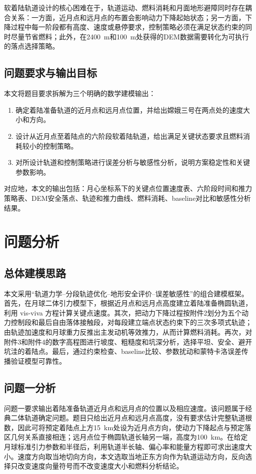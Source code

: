 \documentclass[UTF8,a4paper,12pt]{ctexart}
\begin{document}
软着陆轨道设计的核心困难在于，轨道运动、燃料消耗和月面地形避障同时存在耦合关系：一方面，近月点和远月点的布置会影响动力下降起始状态；另一方面，下降过程中每一阶段都有高度、速度或悬停要求，控制策略必须在满足状态约束的同时尽量节省燃料；此外，在\SI{2400}{m}和\SI{100}{m}处获得的DEM数据需要转化为可执行的落点选择策略。

\subsection{问题要求与输出目标}
本文将题目要求拆解为三个明确的数学建模输出：
\begin{enumerate}[label=（\arabic*）]
  \item 确定着陆准备轨道的近月点和远月点位置，并给出嫦娥三号在两点处的速度大小和方向。
  \item 设计从近月点至着陆点的六阶段软着陆轨道，给出满足关键状态要求且燃料消耗较小的控制策略。
  \item 对所设计轨道和控制策略进行误差分析与敏感性分析，说明方案稳定性和关键参数影响。
\end{enumerate}

对应地，本文的输出包括：月心坐标系下的关键点位置速度表、六阶段时间和推力策略表、DEM安全落点、轨迹和推力曲线、燃料消耗、baseline对比和敏感性分析结果。

\section{问题分析}
\subsection{总体建模思路}
本文采用``轨道力学--分段轨迹优化--地形安全评价--误差敏感性''的组合建模框架。首先，在月球二体引力模型下，根据近月点和远月点高度建立着陆准备椭圆轨道，利用 vis-viva 方程计算关键点速度。其次，把动力下降过程按附件2划分为五个动力控制段和最后自由落体接触段，对每段建立端点状态约束下的三次多项式轨迹；由轨迹加速度和月球重力反推出主发动机等效推力，从而计算燃料消耗。再次，对附件3和附件4的数字高程图进行坡度、粗糙度和坑深分析，选择平坦、安全、避开坑洼的着陆点。最后，通过约束检查、baseline比较、参数扰动和蒙特卡洛误差传播验证模型可靠性。

\subsection{问题一分析}
问题一要求输出着陆准备轨道近月点和远月点的位置以及相应速度。该问题属于经典二体轨道确定问题。题目只给出近月点和远月点高度，没有要求估计完整轨道根数，因此可将预定着陆点上方\SI{15}{km}处设为近月点方向，使动力下降起点与预定落区几何关系直接相连；远月点位于椭圆轨道长轴另一端，高度为\SI{100}{km}。在给定月球标准引力参数和半径后，利用轨道半长轴、偏心率和能量方程即可求出速度大小。速度方向取当地切向方向，本文选取当地正东方向作为轨道运动方向，反向选择只改变速度向量符号而不改变速度大小和燃料分析结论。
\end{document}
